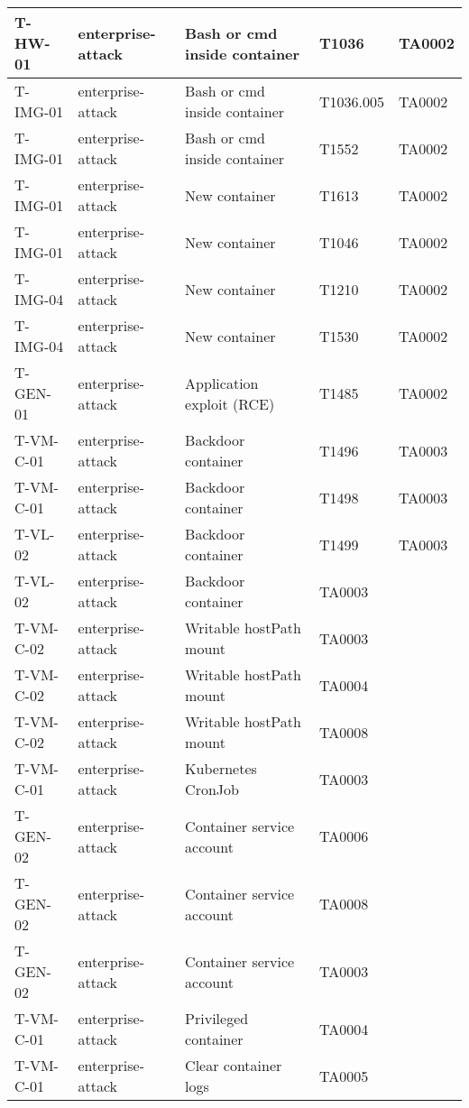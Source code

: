 \begin{table}[!ht]
\begin{longtable}{|l|l|l|l|l|}
        T-HW-01 & enterprise-attack & Bash or cmd inside container & T1036 & TA0002 \\ \hline
        T-IMG-01 & enterprise-attack & Bash or cmd inside container & T1036.005 & TA0002 \\ \hline
        T-IMG-01 & enterprise-attack & Bash or cmd inside container & T1552 & TA0002 \\ \hline
        T-IMG-01 & enterprise-attack & New container & T1613 & TA0002 \\ \hline
        T-IMG-01 & enterprise-attack & New container & T1046 & TA0002 \\ \hline
        T-IMG-04 & enterprise-attack & New container & T1210 & TA0002 \\ \hline
        T-IMG-04 & enterprise-attack & New container & T1530 & TA0002 \\ \hline
        T-GEN-01 & enterprise-attack & Application exploit (RCE) & T1485 & TA0002 \\ \hline
        T-VM-C-01 & enterprise-attack & Backdoor container & T1496 & TA0003 \\ \hline
        T-VM-C-01 & enterprise-attack & Backdoor container & T1498 & TA0003 \\ \hline
        T-VL-02 & enterprise-attack & Backdoor container & T1499 & TA0003 \\ \hline
        T-VL-02 & enterprise-attack & Backdoor container & TA0003 & ~ \\ \hline
        T-VM-C-02 & enterprise-attack & Writable hostPath mount & TA0003 & ~ \\ \hline
        T-VM-C-02 & enterprise-attack & Writable hostPath mount & TA0004 & ~ \\ \hline
        T-VM-C-02 & enterprise-attack & Writable hostPath mount & TA0008 & ~ \\ \hline
        T-VM-C-01 & enterprise-attack & Kubernetes CronJob & TA0003 & ~ \\ \hline
        T-GEN-02 & enterprise-attack & Container service account & TA0006 & ~ \\ \hline
        T-GEN-02 & enterprise-attack & Container service account & TA0008 & ~ \\ \hline
        T-GEN-02 & enterprise-attack & Container service account & TA0003 & ~ \\ \hline
        T-VM-C-01 & enterprise-attack & Privileged container & TA0004 & ~ \\ \hline
        T-VM-C-01 & enterprise-attack & Clear container logs & TA0005 & ~ \\ \hline

\end{longtable}
\end{table}
